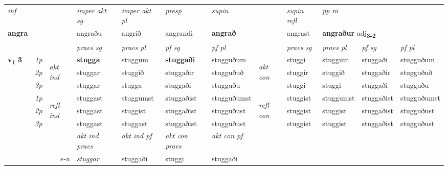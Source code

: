 \begin{longtable}[l]{X>{\footnotesize\itshape}llXXXXlXXXX}
   {\textit{inf}} & &  & \textit{imper akt sg} & \textit{imper akt pl}   & \textit{presp} & \textit{supin} && \textit{supin refl} & \textit{pp m} \\*
  {\textbf{angra}} & && angraðu  & angrið   & angrandi &  \textbf{angrað} && angrast & \multicolumn{2}{l}{\textbf{angraður} adj\textbf{\textsubscript{3-2}}} \\*

\midrule

 & &   & \textit{praes sg}  & \textit{praes pl}    & \textit{ pf sg} & \textit{pf pl} & & \textit{praes sg}  & \textit{praes pl}    & \textit{pf sg} & \textit{pf pl }  \\ \cmidrule{4-7} \cmidrule{9-12}
 \multirow{2}{*}{{{\textbf{v{\textsubscript{1}}} \Large{\textbf{3}}}}}  & 1p & \multirow{3}{*}{\begin{turn}{90}\textit{akt ind}\end{turn}} & \textbf{stugga} & stuggum & \textbf{stuggaði} & stugguðum & \multirow{3}{*}{\begin{turn}{90}\textit{akt con}\end{turn}} &stuggi & stuggum & stuggaði & stugguðum\\*
 & 2p &  &  stuggar  & stuggið & stuggaðir & stugguðuð & & stuggir & stuggið & stuggaðir & stugguðuð \\*
 & 3p &  & stuggar & stugga & stuggaði & stugguðu & & stuggi & stuggi& stuggaði & stugguðu \\*
\cmidrule{4-7} \cmidrule{9-12}
 & 1p & \multirow{3}{*}{\begin{turn}{90}\textit{refl ind}\end{turn}}  & stuggast & stuggumst & stuggaðist & stugguðumst & \multirow{3}{*}{\begin{turn}{90}\textit{refl con}\end{turn}}  &stuggist & stuggumst & stuggaðist & stugguðumst \\*
 & 2p &  & stuggast & stuggist & stuggaðist & stugguðust & &stuggist & stuggist & stuggaðist & stugguðust \\*
 & 3p  & & stuggast & stuggast & stuggaðist & stugguðust & & stuggist & stuggist& stuggaðist & stugguðust \\*
\cmidrule{4-7} \cmidrule{9-12}

   && &  \textit{akt ind praes} & \textit{akt ind pf} & \textit{akt con praes} & \textit{akt con pf} \\*
\multicolumn{3}{r}{\textit{e-n}} & stuggar & stuggaði & stuggi & stuggaði \\*


\end{longtable}
